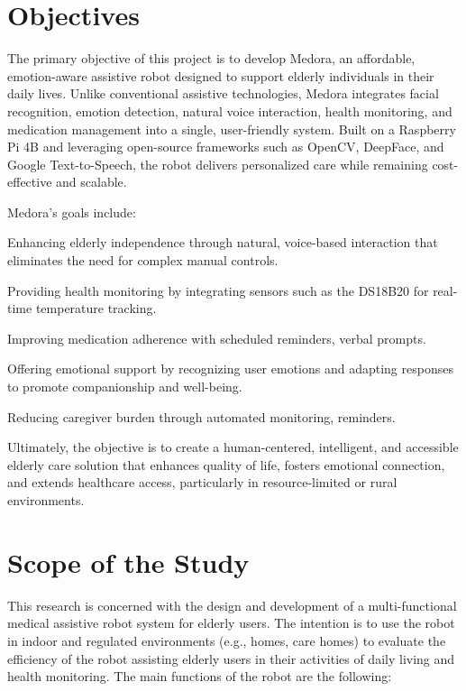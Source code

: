 \section{Objectives}
\label{sec:Objective}


The primary objective of this project is to develop Medora, an affordable, emotion-aware assistive robot designed to support elderly individuals in their daily lives. Unlike conventional assistive technologies, Medora integrates facial recognition, emotion detection, natural voice interaction, health monitoring, and medication management into a single, user-friendly system. Built on a Raspberry Pi 4B and leveraging open-source frameworks such as OpenCV, DeepFace, and Google Text-to-Speech, the robot delivers personalized care while remaining cost-effective and scalable.

Medora’s goals include:

Enhancing elderly independence through natural, voice-based interaction that eliminates the need for complex manual controls.

Providing health monitoring by integrating sensors such as the DS18B20 for real-time temperature tracking.

Improving medication adherence with scheduled reminders, verbal prompts.

Offering emotional support by recognizing user emotions and adapting responses to promote companionship and well-being.

Reducing caregiver burden through automated monitoring, reminders.

Ultimately, the objective is to create a human-centered, intelligent, and accessible elderly care solution that enhances quality of life, fosters emotional connection, and extends healthcare access, particularly in resource-limited or rural environments.

\section{Scope of the Study}
\label{sec:Scope of the Study}

This research is concerned with the design and development of a multi-functional medical assistive robot system for elderly users. The intention is to use the robot in indoor and regulated environments (e.g., homes, care homes) to evaluate the efficiency of the robot assisting elderly users in their activities of daily living and health monitoring. The main functions of the robot are the following:

